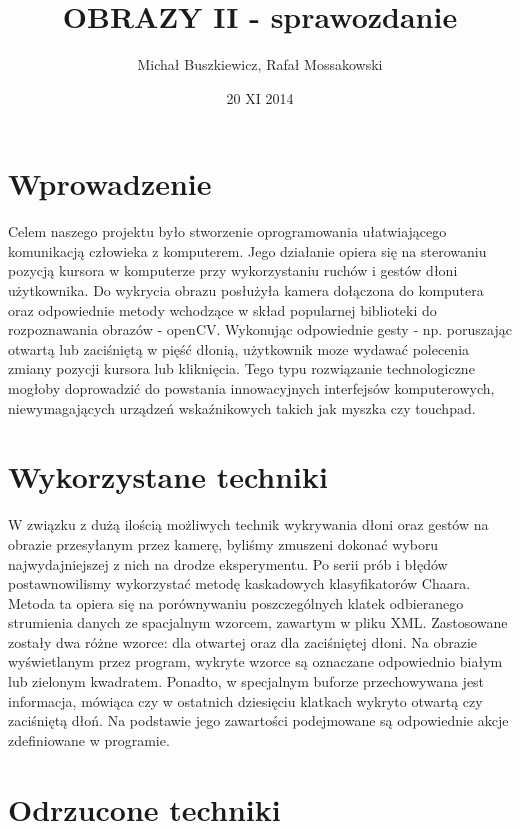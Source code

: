 \documentclass[a4paper,12pt]{article}
\begin{document}
\begin{titlepage}
\title{OBRAZY II - sprawozdanie}
\author{Michał Buszkiewicz, Rafał Mossakowski}
\date{20 XI 2014}
\maketitle
\end{titlepage}

\section{Wprowadzenie}
Celem naszego projektu było stworzenie oprogramowania ułatwiającego komunikacją człowieka z komputerem. Jego działanie opiera się na sterowaniu pozycją kursora w komputerze przy wykorzystaniu ruchów i gestów dłoni użytkownika. Do wykrycia obrazu posłużyła kamera dołączona do komputera oraz odpowiednie metody wchodzące w skład popularnej biblioteki do rozpoznawania obrazów - openCV. Wykonując odpowiednie gesty - np. poruszając otwartą lub zaciśniętą w pięść dłonią, użytkownik moze wydawać polecenia zmiany pozycji kursora lub kliknięcia. Tego typu rozwiązanie technologiczne mogłoby doprowadzić do powstania innowacyjnych interfejsów komputerowych, niewymagających urządzeń wskaźnikowych takich jak myszka czy touchpad.

\section{Wykorzystane techniki}
W związku z dużą ilością możliwych technik wykrywania dłoni oraz gestów na obrazie przesyłanym przez kamerę, byliśmy zmuszeni dokonać wyboru najwydajniejszej z nich na drodze eksperymentu. Po serii prób i błędów postawnowilismy wykorzystać metodę kaskadowych klasyfikatorów Chaara. Metoda ta opiera się na porównywaniu poszczególnych klatek odbieranego strumienia danych ze spacjalnym wzorcem, zawartym w pliku XML. Zastosowane zostały dwa różne wzorce: dla otwartej oraz dla zaciśniętej dłoni. Na obrazie wyświetlanym przez program, wykryte wzorce są oznaczane odpowiednio białym lub zielonym kwadratem. Ponadto, w specjalnym buforze przechowywana jest informacja, mówiąca czy w ostatnich dziesięciu klatkach wykryto otwartą czy zaciśniętą dłoń. Na podstawie jego zawartości podejmowane są odpowiednie akcje zdefiniowane w programie.



\section{Odrzucone techniki}
\end{document}
